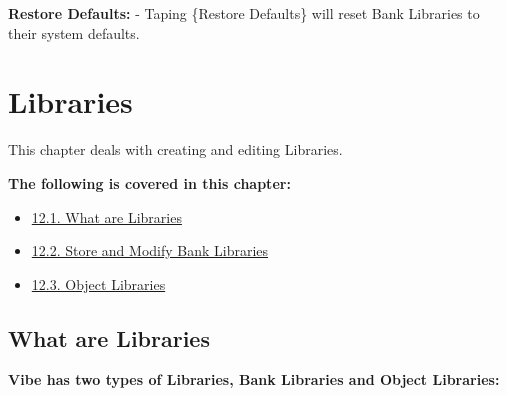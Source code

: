 \documentclass[
]{article}
\providecommand{\tightlist}{%
  \setlength{\itemsep}{0pt}\setlength{\parskip}{0pt}}
\begin{document}
\textbf{Restore Defaults:} - Taping \{Restore Defaults\} will reset Bank Libraries to their system defaults.

\hypertarget{libraries}{%
\section{Libraries}\label{libraries}}

This chapter deals with creating and editing Libraries.

\textbf{The following is covered in this chapter:}

\begin{itemize}
\tightlist
\item
  \href{https://vibemanual.compulite.com/libraries.html\#what-are-libraries}{12.1. What are Libraries}
\item
  \href{https://vibemanual.compulite.com/libraries.html\#store-and-modify-bank-libraries}{12.2. Store and Modify Bank Libraries}
\item
  \href{https://vibemanual.compulite.com/libraries.html\#object-libraries}{12.3. Object Libraries}
\end{itemize}

\hypertarget{what-are-libraries}{%
\subsection{What are Libraries}\label{what-are-libraries}}

\textbf{Vibe has two types of Libraries, Bank Libraries and Object Libraries:}
\end{document}
